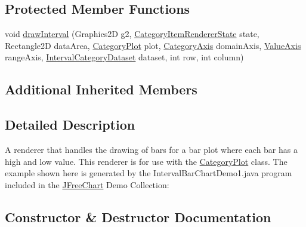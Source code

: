 \subsection*{Protected Member Functions}
\begin{DoxyCompactItemize}
\item 
void \mbox{\hyperlink{classorg_1_1jfree_1_1chart_1_1renderer_1_1category_1_1_interval_bar_renderer_a4dc83197bd4843469565ff886cd7edeb}{draw\+Interval}} (Graphics2D g2, \mbox{\hyperlink{classorg_1_1jfree_1_1chart_1_1renderer_1_1category_1_1_category_item_renderer_state}{Category\+Item\+Renderer\+State}} state, Rectangle2D data\+Area, \mbox{\hyperlink{classorg_1_1jfree_1_1chart_1_1plot_1_1_category_plot}{Category\+Plot}} plot, \mbox{\hyperlink{classorg_1_1jfree_1_1chart_1_1axis_1_1_category_axis}{Category\+Axis}} domain\+Axis, \mbox{\hyperlink{classorg_1_1jfree_1_1chart_1_1axis_1_1_value_axis}{Value\+Axis}} range\+Axis, \mbox{\hyperlink{interfaceorg_1_1jfree_1_1data_1_1category_1_1_interval_category_dataset}{Interval\+Category\+Dataset}} dataset, int row, int column)
\end{DoxyCompactItemize}
\subsection*{Additional Inherited Members}


\subsection{Detailed Description}
A renderer that handles the drawing of bars for a bar plot where each bar has a high and low value. This renderer is for use with the \mbox{\hyperlink{}{Category\+Plot}} class. The example shown here is generated by the {\ttfamily Interval\+Bar\+Chart\+Demo1.\+java} program included in the \mbox{\hyperlink{classorg_1_1jfree_1_1chart_1_1_j_free_chart}{J\+Free\+Chart}} Demo Collection\+: ~\newline
~\newline
  

\subsection{Constructor \& Destructor Documentation}
\mbox{\label{classorg_1_1jfree_1_1chart_1_1renderer_1_1category_1_1_interval_bar_renderer_aa68b5825f13e626277196e92e65802eb}} 
